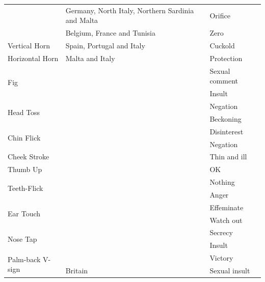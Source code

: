 \begin{table}
\begin{tabular}{|l|l|l|}
                                & Germany, North Italy, Northern Sardinia and Malta & Orifice\\ \cline{2-3} 
                                & Belgium, France and Tunisia                       & Zero\\ \hline
        Vertical Horn                     & Spain, Portugal and Italy & Cuckold        \\ \hline
        Horizontal Horn                   & Malta and Italy           & Protection     \\ \hline
        \multirow{2}{*}{Fig}              &                           & Sexual comment \\ \cline{2-3} 
                                          &                           & Insult         \\ \hline
        \multirow{2}{*}{Head Toss}        &                           & Negation       \\ \cline{2-3} 
                                          &                           & Beckoning      \\ \hline
        \multirow{2}{*}{Chin Flick}       &                           & Disinterest    \\ \cline{2-3} 
                                          &                           & Negation       \\ \hline
        Cheek Stroke                      &                           & Thin and ill   \\ \hline
        Thumb Up                          &                           & OK             \\ \hline
        \multirow{2}{*}{Teeth-Flick}      &                           & Nothing        \\ \cline{2-3} 
                                          &                           & Anger          \\ \hline
        \multirow{2}{*}{Ear Touch}        &                           & Effeminate     \\ \cline{2-3} 
                                          &                           & Watch out      \\ \hline
        \multirow{2}{*}{Nose Tap}         &                           & Secrecy        \\ \cline{2-3} 
                                          &                           & Insult         \\ \hline
        \multirow{2}{*}{Palm-back V-sign} &                           & Victory        \\ \cline{2-3} 
                                          & Britain                   & Sexual insult  \\ \hline
                                        
    \end{tabular}
\end{table}

